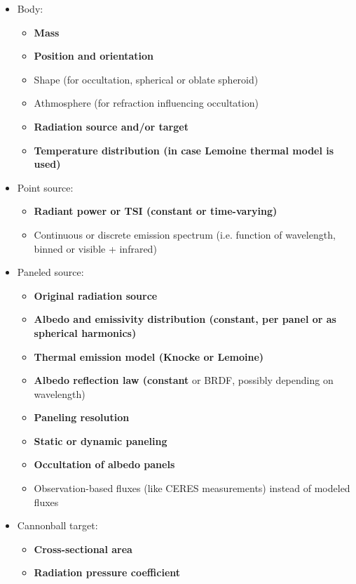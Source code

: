 \documentclass[parskip=full,DIV=15]{scrartcl}
\begin{document}
\begin{itemize}
   \item Body:
   \begin{itemize}
      \item \textbf{Mass}
      \item \textbf{Position and orientation}
      \item Shape (for occultation, spherical or oblate spheroid)
      \item Athmosphere (for refraction influencing occultation)
      \item \textbf{Radiation source and/or target}
      \item \textbf{Temperature distribution (in case Lemoine thermal model is used)}
   \end{itemize}
   \item Point source:
   \begin{itemize}
      \item \textbf{Radiant power or TSI (constant or time-varying)}
      \item Continuous or discrete emission spectrum (i.e. function of wavelength, binned or visible + infrared)
   \end{itemize}
   \item Paneled source:
   \begin{itemize}
      \item \textbf{Original radiation source}
      \item \textbf{Albedo and emissivity distribution (constant, per panel or as spherical harmonics)}
      \item \textbf{Thermal emission model (Knocke or Lemoine)}
      \item \textbf{Albedo reflection law (constant} or BRDF, possibly depending on wavelength)
      \item \textbf{Paneling resolution}
      \item \textbf{Static or dynamic paneling}
      \item \textbf{Occultation of albedo panels}
      \item Observation-based fluxes (like CERES measurements) instead of modeled fluxes
   \end{itemize}
   \item Cannonball target:
   \begin{itemize}
      \item \textbf{Cross-sectional area}
      \item \textbf{Radiation pressure coefficient}
   \end{itemize}

\end{itemize}
\end{document}
